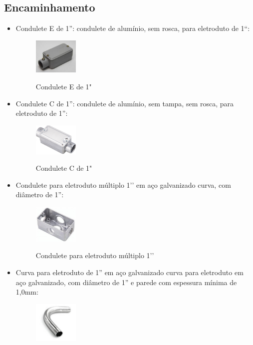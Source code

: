 \documentclass[	DIV=calc,%
							paper=a4,%
							fontsize=12pt,%
							onecolumn]{scrartcl}	 					%
\begin{document}
\subsection{Encaminhamento}
\begin{itemize}
\item Condulete E de 1”: condulete de alumínio, sem rosca, para eletroduto de 1“:
\begin{figure}[h!]
	\centering
	\includegraphics[width=0.2\textwidth]{figura16.jpg}
	\label{figura16}
	\caption{Condulete E de 1"}
\end{figure}
\item Condulete C de 1”: condulete de alumínio, sem tampa, sem rosca, para eletroduto de 1”:
\begin{figure}[h!]
	\centering
	\includegraphics[width=0.2\textwidth]{figura15.png}
	\label{figura15}
	\caption{Condulete C de 1"}
\end{figure}
\item Condulete para eletroduto múltiplo 1’’ em aço galvanizado curva, com diâmetro de 1”:
\begin{figure}[h!]
	\centering
\includegraphics[width=0.2\textwidth]{figura17.jpeg}
	\label{figura17}
	\caption{Condulete para eletroduto múltiplo 1’’}
\end{figure}
\item Curva para eletroduto de 1” em aço galvanizado curva para eletroduto em aço galvanizado, com diâmetro de 1” e parede com espessura mínima de 1,0mm:
\begin{figure}[h!]
	\centering
\includegraphics[width=0.2\textwidth]{figura18.jpg}

\end{figure}
\end{itemize}
\end{document}
